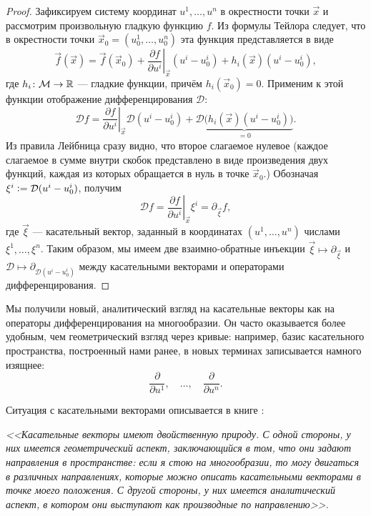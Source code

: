 \begin{proof}
	Зафиксируем систему координат $u^1, \ldots, u^n$ в окрестности точки $\vec{x}$ и рассмотрим произвольную гладкую функцию $f$. Из формулы Тейлора следует, что в окрестности точки $\vec{x}_0 = (u_0^1, \ldots, u_0^n)$ эта функция представляется в виде
	\[
		\vec{f}(\vec{x}) = \vec{f}(\vec{x}_0) + \left.\frac{\partial f}{\partial u^i}\right|_{\vec{x}}(u^i - u_0^i) + h_i(\vec{x})(u^i - u_0^i),
	\]
	где $h_i\colon \mathcal{M} \to \mathbb{R}$ --- гладкие функции, причём $h_i(\vec{x}_0) = 0$. Применим к этой функции отображение дифференцирования $\mathcal{D}$:
	\[
		\mathcal{D} f = \left.\frac{\partial f}{\partial u^i}\right|_{\vec{x}}\mathcal{D}(u^i - u_0^i) + {\underbrace{\mathcal{D}\big(h_i(\vec{x})(u^i - u_0^i)\big)}_{= 0}}.
	\]
	Из правила Лейбница сразу видно, что второе слагаемое нулевое (каждое слагаемое в сумме внутри скобок представлено в виде произведения двух функций, каждая из которых обращается в нуль в точке $\vec{x}_0$.) Обозначая $\xi^i \vcentcolon = \mathcal{D}(u^i - u_0^i)$, получим
	\[
		\mathcal{D}f = \left.\frac{\partial f}{\partial u^i}\right|_{\vec{x}}\xi^i = \partial_{\vec{\xi}}f,
	\]
	где $\vec{\xi}$ --- касательный вектор, заданный в координатах $(u^1, \ldots, u^n)$ числами $\xi^1, \ldots, \xi^n$. Таким образом, мы имеем две взаимно-обратные инъекции $\vec{\xi} \mapsto \partial_{\vec{\xi}}$ и $\mathcal{D} \mapsto \partial_{\mathcal{D}(u^i - u_0^i)}$ между касательными векторами и операторами дифференцирования.
\end{proof}

Мы получили новый, аналитический взгляд на касательные векторы как на операторы дифференцирования на многообразии. Он часто оказывается более удобным, чем геометрический взгляд через кривые: например, базис касательного пространства, построенный нами ранее, в новых терминах записывается намного изящнее:
\[
	\frac{\partial}{\partial u^1},\quad \ldots,\quad\frac{\partial}{\partial u^n}.
\]

Ситуация с касательными векторами описывается в книге \cite{S19}:

\begin{center}
	\begin{minipage}{.9\textwidth} \centering
		\textit{<<Касательные векторы имеют двойственную природу. С одной стороны, у них имеется геометрический аспект, заключающийся в том, что они задают направления в пространстве: если я стою на многообразии, то могу двигаться в различных направлениях, которые можно описать касательными векторами в точке моего положения. С другой стороны, у них имеется аналитический аспект, в котором они выступают как \glqq производные по направлению\grqq>>.}
	\end{minipage}
\end{center}

